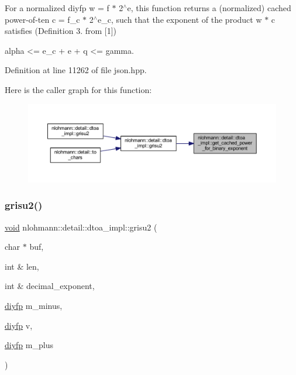 For a normalized diyfp w = f $\ast$ 2$^\wedge$e, this function returns a (normalized) cached power-\/of-\/ten c = f\+\_\+c $\ast$ 2$^\wedge$e\+\_\+c, such that the exponent of the product w $\ast$ c satisfies (Definition 3. from \mbox{[}1\mbox{]}) \begin{DoxyVerb} alpha <= e_c + e + q <= gamma.
\end{DoxyVerb}
 

Definition at line 11262 of file json.\+hpp.

Here is the caller graph for this function\+:
\nopagebreak
\begin{figure}[H]
\begin{center}
\leavevmode
\includegraphics[width=350pt]{namespacenlohmann_1_1detail_1_1dtoa__impl_adbf329a18c5cf854a3477327afd2200b_icgraph}
\end{center}
\end{figure}
\mbox{\label{namespacenlohmann_1_1detail_1_1dtoa__impl_a05b681dcb8569b9784c6dccfadb01633}} 
\subsubsection{\texorpdfstring{grisu2()}{grisu2()}\hspace{0.1cm}{\footnotesize\ttfamily [1/2]}}
{\footnotesize\ttfamily \mbox{\hyperlink{namespacenlohmann_1_1detail_a59fca69799f6b9e366710cb9043aa77d}{void}} nlohmann\+::detail\+::dtoa\+\_\+impl\+::grisu2 (\begin{DoxyParamCaption}\item[{char $\ast$}]{buf,  }\item[{int \&}]{len,  }\item[{int \&}]{decimal\+\_\+exponent,  }\item[{\mbox{\hyperlink{structnlohmann_1_1detail_1_1dtoa__impl_1_1diyfp}{diyfp}}}]{m\+\_\+minus,  }\item[{\mbox{\hyperlink{structnlohmann_1_1detail_1_1dtoa__impl_1_1diyfp}{diyfp}}}]{v,  }\item[{\mbox{\hyperlink{structnlohmann_1_1detail_1_1dtoa__impl_1_1diyfp}{diyfp}}}]{m\+\_\+plus }\end{DoxyParamCaption})\hspace{0.3cm}{\ttfamily [inline]}}

